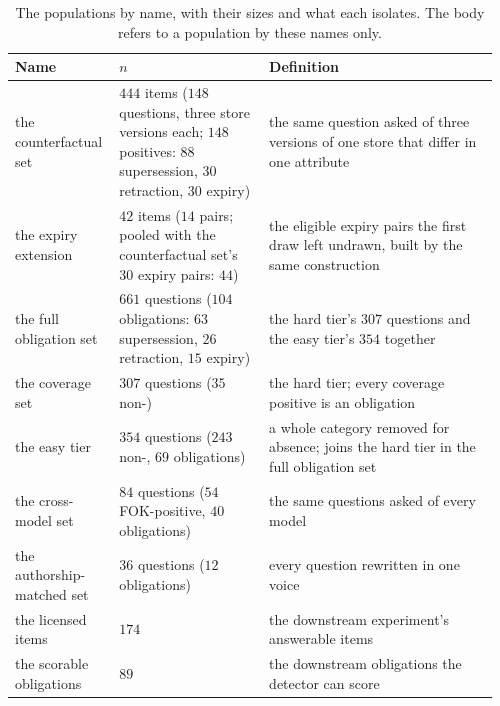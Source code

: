 \begin{table}[H]
\caption{The populations by name, with their sizes and what each isolates. The body refers to a population by these names only.}
\label{tab:populations}
\centering
\scriptsize
\setlength{\tabcolsep}{3pt}
\begin{tabular}{@{}p{0.2\linewidth}p{0.3\linewidth}p{0.46\linewidth}@{}}
\toprule
Name & $n$ & Definition \\
\midrule
the counterfactual set & $444$ items ($148$ questions, three store versions each; $148$ positives: $88$ supersession, $30$ retraction, $30$ expiry) & the same question asked of three versions of one store that differ in one attribute \\
the expiry extension & $42$ items ($14$ pairs; pooled with the counterfactual set's $30$ expiry pairs: $44$) & the eligible expiry pairs the first draw left undrawn, built by the same construction \\
the full obligation set & $661$ questions ($104$ obligations: $63$ supersession, $26$ retraction, $15$ expiry) & the hard tier's $307$ questions and the easy tier's $354$ together \\
the coverage set & $307$ questions ($35$ non-\absent{}) & the hard tier; every coverage positive is an obligation \\
the easy tier & $354$ questions ($243$ non-\absent{}, $69$ obligations) & a whole category removed for absence; joins the hard tier in the full obligation set \\
the cross-model set & $84$ questions ($54$ FOK-positive, $40$ obligations) & the same questions asked of every model \\
the authorship-matched set & $36$ questions ($12$ obligations) & every question rewritten in one voice \\
the licensed items & $174$ & the downstream experiment's answerable items \\
the scorable obligations & $89$ & the downstream obligations the detector can score \\
\bottomrule
\end{tabular}
\end{table}
